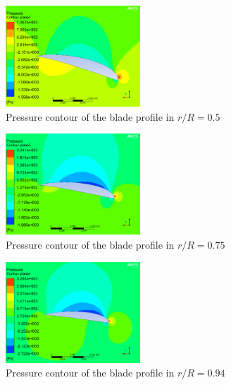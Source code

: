 \begin{figure}[H]
  \includegraphics[width=0.45\textwidth]{fig2}
\caption{Pressure contour of the blade profile in $r/R=0.5$}
\label{fig:5}       %
\end{figure}
\vspace{-0.6cm}
\begin{figure}[H]
  \includegraphics[width=0.45\textwidth]{fig3}
\caption{Pressure contour of the blade profile in $r/R=0.75$}
\label{fig:6}       %
\end{figure}
\vspace{-0.6cm}
\begin{figure}[H]
  \includegraphics[width=0.45\textwidth]{fig4}
\caption{Pressure contour of the blade profile in $r/R=0.94$}
\label{fig:7}       %
\end{figure}

